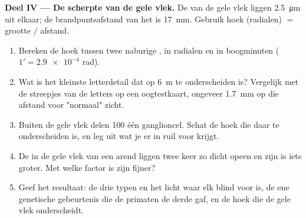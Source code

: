 \begin{problem}
\medskip
\noindent\textbf{Deel IV --- De scherpte van de gele vlek.}
De  van de gele vlek liggen \qty{2.5}{\micro m} uit elkaar; de
brandpuntsafstand van het  is \qty{17}{mm}. Gebruik hoek (radialen)
$=$ grootte $/$ afstand.
\begin{enumerate}[resume]
  \item Bereken de hoek tussen twee naburige , in radialen en in
        boogminuten ($1' = \num{2.9e-4}$ rad).
  \item Wat is het kleinste letterdetail dat op \qty{6}{m} te
        onderscheiden is? Vergelijk met de streepjes van de letters op
        een oogtestkaart, ongeveer \qty{1.7}{mm} op die afstand voor
        "normaal" zicht.
  \item Buiten de gele vlek delen 100  één ganglioncel. Schat de
        hoek die daar te onderscheiden is, en leg uit wat je er in ruil
        voor krijgt.
  \item De  in de gele vlek van een arend liggen twee keer zo
        dicht opeen en zijn  is iets groter. Met welke factor is zijn
         fijner?
  \item Geef het resultaat: de drie typen  en het licht waar
        elk blind voor is, de ene genetische gebeurtenis die de primaten
        de derde gaf, en de hoek die de gele vlek onderscheidt.
\end{enumerate}
\end{problem}
